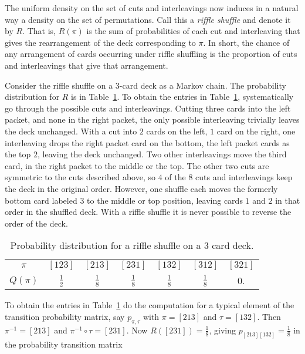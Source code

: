 \documentclass[12pt]{article}
\begin{document}
The uniform density on the set of cuts and interleavings now induces in
a natural way a density on the set of permutations.  Call this a \emph{riffle
shuffle} and denote it by \( R \).  That is, \( R(\pi) \) is the sum of
probabilities of each cut and interleaving that gives the rearrangement
of the deck corresponding to \( \pi \).  In short, the chance of any
arrangement of cards occurring under riffle shuffling is the proportion
of cuts and interleavings that give that arrangement.

\begin{example}
    Consider the riffle shuffle on a \( 3 \)-card deck as a Markov
    chain. The probability distribution for \( R \) is in
    Table~\ref{tab:cardshuffling:riffle3}.  To obtain the entries in
    Table~\ref{tab:cardshuffling:riffle3}, 
    systematically go through the possible cuts and interleavings.
    Cutting three cards into the left packet, and none in the right packet, the only
    possible interleaving trivially leaves the deck unchanged.  With a
    cut into \( 2 \) cards on the left, \( 1 \) card on the right, one
    interleaving drops the right packet card on the bottom, the left
    packet cards as the top \( 2 \), leaving the deck unchanged.  Two
    other interleavings move the third card, in the right packet to
    the middle or the top.  The other two cuts are symmetric to the
    cuts described above, so \( 4 \) of the \( 8 \) cuts and
    interleavings keep the deck in the original order.  However, one
    shuffle each moves the formerly bottom card labeled \( 3 \) to the
    middle or top position, leaving cards \( 1 \) and \( 2 \) in that
    order in the shuffled deck.   With a riffle shuffle it is never
    possible to reverse the order of the deck.

    \begin{table}
      \centering
      \caption{Probability distribution for a riffle shuffle on a $3$
        card deck. }
    \begin{tabular}{ccccccc}
        $\pi$    & $[123]$       & $[213]$       & $[231]$       & $[132]$       & $[312]$       & $[321]$ \\ 
        $Q(\pi)$ & $\frac{1}{2}$ & $\frac{1}{8}$ & $\frac{1}{8}$ & $\frac{1}{8}$ & $\frac{1}{8}$ & 0.      \\ 
    \end{tabular}
      \label{tab:cardshuffling:riffle3}
    \end{table}

    To obtain the entries in Table~\ref{tab:cardshuffling:riffle3} do
    the computation for a typical element of the transition
    probability matrix, say \( p_{\pi,\tau} \) with \( \pi = [213] \)
    and \( \tau = [132] \). Then \( \pi^{-1} = [213] \) and \( \pi^{-1}
    \circ \tau = [231] \).  Now \( R([231]) = \frac{1}{8} \), giving \(
    p_{[213] [132]} = \frac{1}{8} \) in the probability transition
    matrix


\end{example}
\end{document}
